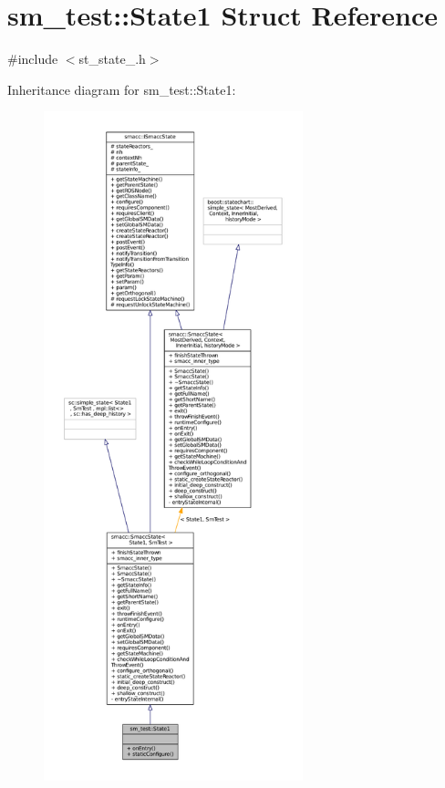 \hypertarget{structsm__test_1_1State1}{}\section{sm\+\_\+test\+:\+:State1 Struct Reference}
\label{structsm__test_1_1State1}


{\ttfamily \#include $<$st\+\_\+state\+\_.\+h$>$}



Inheritance diagram for sm\+\_\+test\+:\+:State1\+:
\nopagebreak
\begin{figure}[H]
\begin{center}
\leavevmode
\includegraphics[height=550pt]{structsm__test_1_1State1__inherit__graph}
\end{center}
\end{figure}


